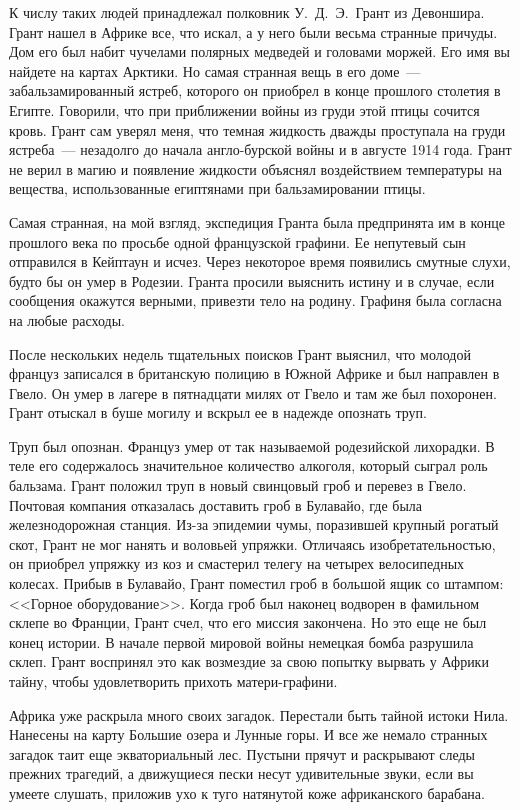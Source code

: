 \documentclass[12pt,a4paper,twoside,openany,svgnames]{memoir}
\begin{document}
К числу таких людей принадлежал полковник У.~Д.~Э.~Грант из Девоншира. Грант нашел в Африке все, что искал, а у него были весьма странные причуды. Дом его был набит чучелами полярных медведей и головами моржей. Его имя вы найдете на картах Арктики. Но самая странная вещь в его доме~--- забальзамированный ястреб, которого он приобрел в конце прошлого столетия в Египте. Говорили, что при приближении войны из груди этой птицы сочится кровь. Грант сам уверял меня, что темная жидкость дважды проступала на груди ястреба~--- незадолго до начала англо-бурской войны и в августе 1914 года. Грант не верил в магию и появление жидкости объяснял воздействием температуры на вещества, использованные египтянами при бальзамировании птицы.

Самая странная, на мой взгляд, экспедиция Гранта была предпринята им в конце прошлого века по просьбе одной французской графини. Ее непутевый сын отправился в Кейптаун и исчез. Через некоторое время появились смутные слухи, будто бы он умер в Родезии. Гранта просили выяснить истину и в случае, если сообщения окажутся верными, привезти тело на родину. Графиня была согласна на любые расходы.

После нескольких недель тщательных поисков Грант выяснил, что молодой француз записался в британскую полицию в Южной Африке и был направлен в Гвело. Он умер в лагере в пятнадцати милях от Гвело и там же был похоронен. Грант отыскал в буше могилу и вскрыл ее в надежде опознать труп.

Труп был опознан. Француз умер от так называемой родезийской лихорадки. В теле его содержалось значительное количество алкоголя, который сыграл роль бальзама. Грант положил труп в новый свинцовый гроб и перевез в Гвело. Почтовая компания отказалась доставить гроб в Булавайо, где была железнодорожная станция. Из-за эпидемии чумы, поразившей крупный рогатый скот, Грант не мог нанять и воловьей упряжки. Отличаясь изобретательностью, он приобрел упряжку из коз и смастерил телегу на четырех велосипедных колесах. Прибыв в Булавайо, Грант поместил гроб в большой ящик со штампом: <<Горное оборудование>>. Когда гроб был наконец водворен в фамильном склепе во Франции, Грант счел, что его миссия закончена. Но это еще не был конец истории. В начале первой мировой войны немецкая бомба разрушила склеп. Грант воспринял это как возмездие за свою попытку вырвать у Африки тайну, чтобы удовлетворить прихоть матери-графини.

Африка уже раскрыла много своих загадок. Перестали быть тайной истоки Нила. Нанесены на карту Большие озера и Лунные горы. И все же немало странных загадок таит еще экваториальный лес. Пустыни прячут и раскрывают следы прежних трагедий, а движущиеся пески несут удивительные звуки, если вы умеете слушать, приложив ухо к туго натянутой коже африканского барабана.
\end{document}
